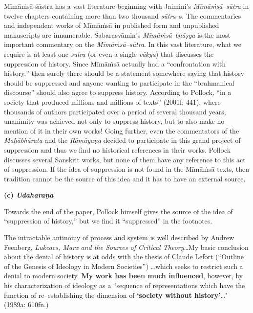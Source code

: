 Mīmāṁsā-śāstra has a vast literature beginning with Jaimini’s \textit{Mīmāṁsā–sūtra} in twelve chapters containing more than two thousand \textit{sūtra}–s. The commentaries and independent works of Mīmāṁsā in published form and unpublished manuscripts are innumerable. Śabarasvāmin’s \textit{Mīmāṁsā–bhāṣya} is the most important commentary on the \textit{Mīmāṁsā–sūtra}. In this vast literature, what we require is at least one \textit{sutra }(or even a single \textit{vākya}) that discusses the suppression of history. Since Mīmāṁsā actually had a “confrontation with history,” then surely there should be a statement somewhere saying that history should be suppressed and anyone wanting to participate in the “brahmanical discourse” should also agree to suppress history. According to Pollock, “in a society that produced millions and millions of texts” (2001f: 441), where thousands of authors participated over a period of several thousand years, unanimity was achieved not only to suppress history, but to also make no mention of it in their own works! Going further, even the commentators of the \textit{Mahābhārata} and the \textit{Rāmāyaṇa} decided to participate in this grand project of suppression and thus we find no historical references in their works. Pollock discusses several Sanskrit works, but none of them have any reference to this act of suppression. If the idea of suppression is not found in the Mīmāṁsā texts, then tradition cannot be the source of this idea and it has to have an external source.

\textbf{(c) \textit{Udāharaṇa}}

Towards the end of the paper, Pollock himself gives the source of the idea of “suppression of history,” but we find it “suppressed” in the footnotes.

\begin{myquote}
The intractable antinomy of process and system is well described by Andrew Feenberg, \textit{Lukcacs, Marx and the Sources of Critical Theory}…My basic conclusion about the denial of history is at odds with the thesis of Claude Lefort (“Outline of the Genesis of Ideology in Modern Societies”) …which seeks to restrict such a denial to modern society. \textbf{My work has been much influenced}, however, by his characterization of ideology as a ``sequence of representations which have the function of re–establishing the dimension of \textbf{`society without history'}…" (1989a: 610fn.)
\end{myquote}

